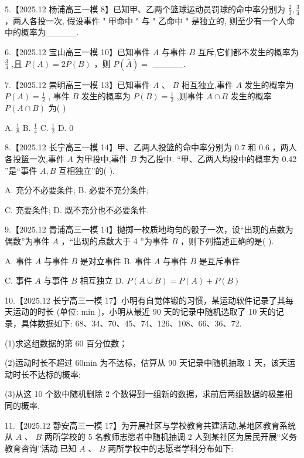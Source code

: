 \documentclass[10pt]{article}
\begin{document}
5.【2025.12 杨浦高三一模 8】已知甲、乙两个篮球运动员罚球的命中率分别为 \(\frac{2}{3},\frac{3}{4}\) ，两人各投一次, 假设事件 " 甲命中 " 与 " 乙命中 " 是独立的, 则至少有一个人命中的概率为\_\_\_\_\_.

6.【2025.12 宝山高三一模 10】已知事件 \(A\) 与事件 \(B\) 互斥,它们都不发生的概率为 \(\frac{3}{4}\) ,且 \(P\left( A\right)  = {2P}\left( B\right)\) ，则 \(P\left( \bar{A}\right)  =\) \_\_\_\_\_.

7.【2025.12 崇明高三一模 13】已知事件 \(A\text{ 、 }B\) 相互独立,事件 \(A\) 发生的概率为 \(P\left( A\right)  = \frac{1}{2}\) , 事件 \(B\) 发生的概率为 \(P\left( B\right)  = \frac{1}{2}\) ,则事件 \(A \cap  B\) 发生的概率 \(P\left( {A \cap  B}\right)\) 为( )

A. \(\frac{1}{8}\) B. \(\frac{1}{4}\) C. \(\frac{1}{2}\) D. 0

8.【2025.12 长宁高三一模 14】甲、乙两人投篮的命中率分别为 0.7 和 0.6 ，两人各投篮一次,事件 \(A\) 为甲投中,事件 \(B\) 为乙投中. “甲、乙两人均投中的概率为 0.42 ”是“事件 \(A,B\) 互相独立”的( ).

A. 充分不必要条件; B. 必要不充分条件;

C. 充要条件; D. 既不充分也不必要条件.

9.【2025.12 青浦高三一模 14】抛掷一枚质地均匀的骰子一次，设“出现的点数为偶数”为事件 \(A\) ，“出现的点数大于 4 ”为事件 \(B\) ，则下列描述正确的是( ).

A. 事件 \(A\) 与事件 \(B\) 是对立事件 B. 事件 \(A\) 与事件 \(B\) 是互斥事件

C. 事件 \(A\) 与事件 \(B\) 相互独立 D. \(P\left( {A \cup  B}\right)  = P\left( A\right)  + P\left( B\right)\)

10.【2025.12 长宁高三一模 17】小明有自觉体锻的习惯，某运动软件记录了其每天运动的时长 (单位: \(\mathrm{{min}}\) )，小明从最近 90 天的记录中随机选取了 10 天的记录，具体数据如下: 68、34、70、45、74、126、108、66、36、72.

(1)求这组数据的第 60 百分位数；

(2)运动时长不超过 60min 为不达标，估算从 90 天记录中随机抽取 1 天，该天运动时长不达标的概率;

(3)从这 10 个数中随机删除 2 个数得到一组新的数据，求前后两组数据的极差相同的概率.

11.【2025.12 静安高三一模 17】为开展社区与学校教育共建活动,某地区教育系统从 \(A\text{ 、 }B\) 两所学校的 5 名教师志愿者中随机抽调 2 人到某社区为居民开展“义务教育咨询”活动.已知 \(A\text{ 、 }B\) 两所学校中的志愿者学科分布如下:

\begin{center}
\end{center}
\end{document}
